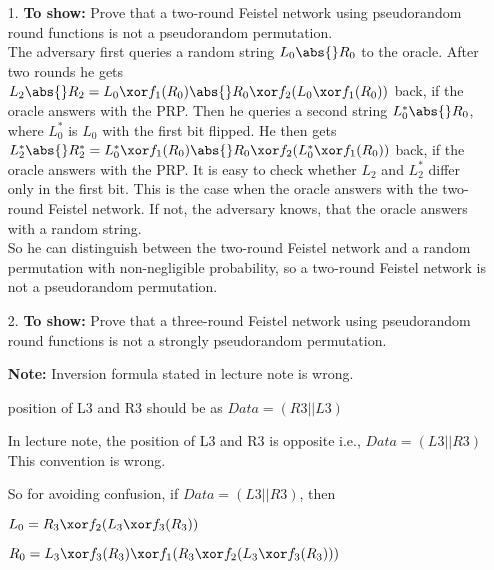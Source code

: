 \begin{itemize}
	\item [1.]
		\textbf{To show:} Prove that a two-round Feistel network using pseudorandom round functions is not a pseudorandom permutation.\\
		The adversary first queries a random string \(L_0 \abs{} R_0\) to the oracle. After two rounds he gets \(L_2 \abs{} R_2 = L_0 \xor f_1(R_0) \abs{} R_0 \xor f_2( L_0 \xor f_1(R_0))\) back, if the oracle answers with the PRP. Then he queries a second string \(L_0^* \abs{} R_0\), where \(L_0^*\) is \(L_0\) with the first bit flipped. 
		He then gets \(L_2^* \abs{} R_2^* = L_0^* \xor f_1(R_0) \abs{} R_0 \xor f_2( L_0^* \xor f_1(R_0))\) back, if the oracle answers with the PRP. It is easy to check whether \(L_2\) and \(L_2^*\) differ only in the first bit. This is the case when the oracle answers with the two-round Feistel network. If not, the adversary knows, that the oracle answers with a random string. \\
		So he can distinguish between the two-round Feistel network and a random permutation with non-negligible probability, so a two-round Feistel network is not a pseudorandom permutation. 
	\item [2.]
		\textbf{To show:} Prove that a three-round Feistel network using pseudorandom round functions is not a strongly pseudorandom permutation.

		
		\textbf{Note:} Inversion formula stated in lecture note is wrong.
		
		position of L3 and R3 should be as $ Data = (R3||L3)$ 



			



			In lecture note, the position of L3 and R3 is opposite i.e., $ Data = (L3||R3)$ This convention is wrong.


			So for avoiding confusion, if  $ Data = (L3||R3)$, then 

			$L_0 = R_3 \xor f_2(L_3 \xor f_3(R_3))$

			$R_0 = L_3 \xor f_3(R_3) \xor f_1(R_3 \xor f_2(L_3 \xor f_3(R_3)))$


\end{itemize}
